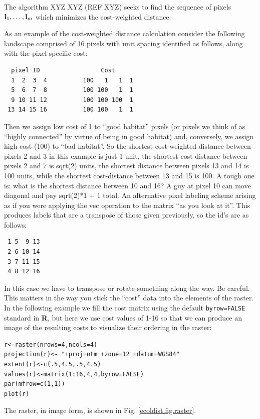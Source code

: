 The algorithm XYZ XYZ (REF XYZ) seeks to find the  sequence of pixels ${\bf l}_{1},
\ldots, {\bf l}_{m}$ which minimizes the cost-weighted distance. 


As an example of the cost-weighted distance calculation consider the
following landscape comprised of 16 pixels with unit spacing 
identified as follows, along with the pixel-specific cost:
\begin{verbatim}
  pixel ID                 Cost
  1  2  3  4          100   1   1  1
  5  6  7  8          100 100   1  1
  9 10 11 12          100 100 100  1
 13 14 15 16          100 100   1  1 
\end{verbatim}
Then we assign low cost of 1 to ``good habitat'' pixels (or pixels we
think of as ``highly connected'' by virtue of being in good habitat)
and, conversely, we assign high cost (100) to ``bad habitat''. So the
shortest cost-weighted distance between pixels 2 and 3 in this example
is just 1 unit, the shortest cost-distance between pixels 2 and 7 is
sqrt(2) units, the shortest distance between pixels 13 and 14 is 100
units, while the shortest cost-distance between 13 and 15 is 100. A
tough one is: what is the shortest distance between 10 and 16? A guy at pixel
10 can move diagonal and pay sqrt(2)*1 + 1 total.
An alternative pixel labeling scheme arising as if you were applying
the vec operation to the matrix ``as you look at it''. This produces
labels that are a transpose of those given previously, so the id's are
as follows:
\begin{verbatim}
 1 5  9 13
 2 6 10 14
 3 7 11 15
 4 8 12 16
\end{verbatim}
In this case we have to transpose or rotate something along the way. 
Be careful. This matters in the way you stick the ``cost'' data into
the elements of the raster.
In the following example we fill the cost
matrix using the default \mbox{\tt byrow=FALSE} standard in {\bf
  R}, but here we use cost values of 1-16 so that we can produce an
image of the resulting costs to visualize their ordering in the raster:
\begin{verbatim}
r<-raster(nrows=4,ncols=4)
projection(r)<- "+proj=utm +zone=12 +datum=WGS84"
extent(r)<-c(.5,4.5,.5,4.5)
values(r)<-matrix(1:16,4,4,byrow=FALSE)
par(mfrow=c(1,1))
plot(r)
\end{verbatim}
The raster, in image form, is shown in Fig. \ref{ecoldist.fig.raster}.

